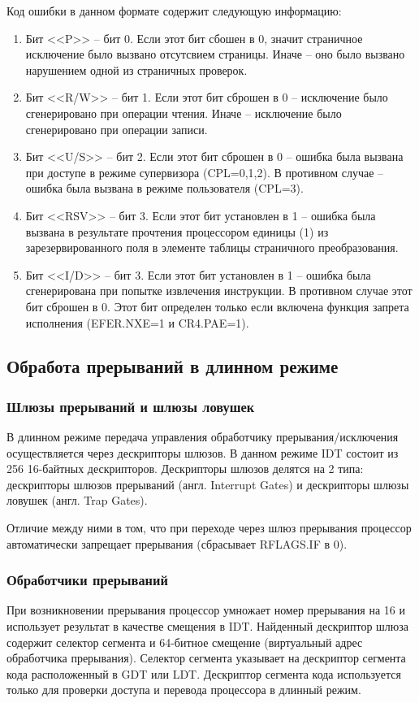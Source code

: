 Код ошибки в данном формате содержит следующую информацию:
\begin{enumerate}[1.]
\item Бит <<P>> -- бит 0. Если этот бит сбошен в 0, значит страничное исключение было
вызвано отсутсвием страницы. Иначе -- оно было вызвано нарушением одной из
страничных проверок.
\item Бит <<R/W>> -- бит 1. Если этот бит сброшен в 0 -- исключение было сгенерировано
при операции чтения. Иначе -- исключение было сгенерировано при операции записи.
\item Бит <<U/S>> -- бит 2. Если этот бит сброшен в 0 -- ошибка была вызвана при
доступе в режиме супервизора (CPL=0,1,2). В противном случае -- ошибка была
вызвана в режиме пользователя (CPL=3).
\item Бит <<RSV>> -- бит 3. Если этот бит установлен в 1 -- ошибка была вызвана в
результате прочтения процессором единицы (1) из зарезервированного поля в
элементе таблицы страничного преобразования.
\item Бит <<I/D>> -- бит 3. Если этот бит установлен в 1 -- ошибка была сгенерирована
при попытке извлечения инструкции. В противном случае этот бит
сброшен в 0. Этот бит определен только если включена функция запрета
исполнения (EFER.NXE=1 и CR4.PAE=1).
\end{enumerate}

\subsection{Обработа прерываний в длинном режиме}
\subsubsection*{Шлюзы прерываний и шлюзы ловушек}
В длинном режиме передача управления обработчику прерывания/исключения
осуществляется через дескрипторы шлюзов. В данном режиме IDT состоит из 256
16-байтных дескрипторов. Дескрипторы шлюзов делятся на 2 типа: дескрипторы шлюзов
прерываний (англ. Interrupt Gates) и дескрипторы шлюзы ловушек (англ. Trap Gates).

Отличие между ними в том, что при переходе через шлюз прерывания процессор
автоматически запрещает прерывания (сбрасывает RFLAGS.IF в 0).

\subsubsection*{Обработчики прерываний}
При возникновении прерывания процессор умножает номер прерывания на 16 и
использует результат в качестве смещения в IDT. Найденный дескриптор шлюза
содержит селектор сегмента и 64-битное смещение (виртуальный адрес обработчика
прерывания). Селектор сегмента указывает на дескриптор сегмента кода
расположенный в GDT или LDT. Дескриптор сегмента кода используется только для
проверки доступа и перевода процессора в длинный режим.

